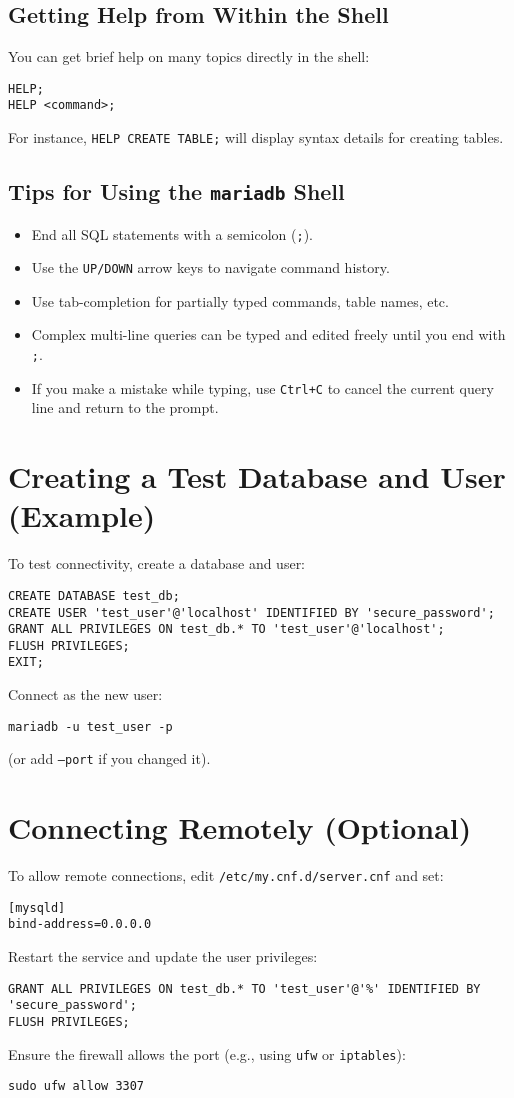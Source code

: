 \documentclass[10pt]{article}
\begin{document}
\subsection{Getting Help from Within the Shell}
You can get brief help on many topics directly in the shell:
\begin{lstlisting}
HELP;
HELP <command>;
\end{lstlisting}
For instance, \texttt{HELP CREATE TABLE;} will display syntax details for creating tables.

\subsection{Tips for Using the \texttt{mariadb} Shell}
\begin{itemize}
    \item End all SQL statements with a semicolon (\texttt{;}).
    \item Use the \texttt{UP/DOWN} arrow keys to navigate command history.
    \item Use tab-completion for partially typed commands, table names, etc.
    \item Complex multi-line queries can be typed and edited freely until you end with \texttt{;}.
    \item If you make a mistake while typing, use \texttt{Ctrl+C} to cancel the current query line and return to the prompt.
\end{itemize}

\section{Creating a Test Database and User (Example)}
To test connectivity, create a database and user:
\begin{verbatim}
CREATE DATABASE test_db;
CREATE USER 'test_user'@'localhost' IDENTIFIED BY 'secure_password';
GRANT ALL PRIVILEGES ON test_db.* TO 'test_user'@'localhost';
FLUSH PRIVILEGES;
EXIT;
\end{verbatim}
Connect as the new user:
\begin{lstlisting}
mariadb -u test_user -p
\end{lstlisting}
(or add \texttt{--port} if you changed it).

\section{Connecting Remotely (Optional)}
To allow remote connections, edit \texttt{/etc/my.cnf.d/server.cnf} and set:
\begin{lstlisting}
[mysqld]
bind-address=0.0.0.0
\end{lstlisting}
Restart the service and update the user privileges:
\begin{lstlisting}
GRANT ALL PRIVILEGES ON test_db.* TO 'test_user'@'%' IDENTIFIED BY 'secure_password';
FLUSH PRIVILEGES;
\end{lstlisting}
Ensure the firewall allows the port (e.g., using \texttt{ufw} or \texttt{iptables}):
\begin{lstlisting}
sudo ufw allow 3307
\end{lstlisting}
\end{document}
